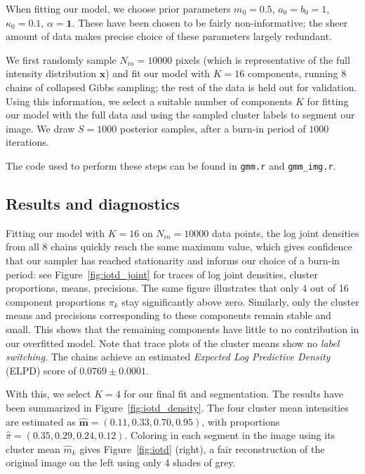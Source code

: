 \documentclass[12pt]{article}
\begin{document}
When fitting our model, we choose prior parameters $m_0 = 0.5$, $a_0 = b_0 =
1$, $\kappa_0 = 0.1$, $\alpha = \bm{1}$.
These have been chosen to be fairly non-informative; the sheer amount of data
makes precise choice of these parameters largely redundant.

We first randomly sample $N_{in} = 10000$ pixels (which is representative of
the full intensity distribution $\bm{x}$) and fit our model with $K = 16$
components, running $8$ chains of collapsed Gibbs sampling; the rest of the
data is held out for validation.
Using this information, we select a suitable number of components $K$ for
fitting our model with the full data and using the sampled cluster labels to
segment our image.
We draw $S = 1000$ posterior samples, after a burn-in period of $1000$
iterations.

The code used to perform these steps can be found in \texttt{gmm.r} and
\texttt{gmm\_img.r}.


\subsection*{Results and diagnostics}

Fitting our model with $K = 16$ on $N_{in} = 10000$ data points, the log joint
densities from all 8 chains quickly reach the same maximum value, which gives
confidence that our sampler has reached stationarity and informs our choice of
a burn-in period: see Figure~\ref{fig:iotd_joint} for traces of log joint
densities, cluster proportions, means, precisions.
The same figure illustrates that only 4 out of 16 component proportions $\pi_k$
stay significantly above zero.
Similarly, only the cluster means and precisions corresponding to these
components remain stable and small.
This shows that the remaining components have little to no contribution in our
overfitted model.
Note that trace plots of the cluster means show no \emph{label switching}.
The chains achieve an estimated \emph{Expected Log Predictive Density} (ELPD)
score of $0.0769 \pm 0.0001$.

With this, we select $K = 4$ for our final fit and segmentation.
The results have been summarized in Figure~\ref{fig:iotd_density}.
The four cluster mean intensities are estimated as $\hat{\bm{m}} = (0.11, 0.33,
0.70, 0.95)$, with proportions $\hat{\pi} = (0.35, 0.29, 0.24, 0.12)$.
Coloring in each segment in the image using its cluster mean $\hat{m}_k$ gives
Figure~\ref{fig:iotd} (right), a fair reconstruction of the original image on
the left using only 4 shades of grey.
\end{document}
